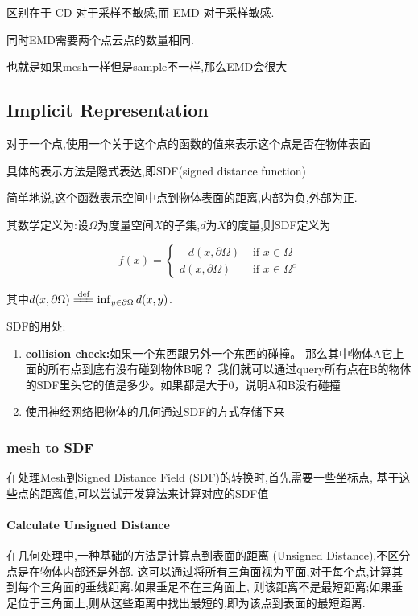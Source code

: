 区别在于 CD 对于采样不敏感,而 EMD 对于采样敏感.

同时EMD需要两个点云点的数量相同.

也就是如果mesh一样但是sample不一样,那么EMD会很大

\subsection{Implicit Representation}

对于一个点,使用一个关于这个点的函数的值来表示这个点是否在物体表面

具体的表示方法是隐式表达,即SDF(signed distance function)

简单地说,这个函数表示空间中点到物体表面的距离,内部为负,外部为正.

其数学定义为:设$\Omega$为度量空间$X$的子集,$d$为$X$的度量,则SDF定义为

\begin{equation}
    f(x)=\begin{cases}
        -d(x, \partial \Omega) & \text { if } x \in \Omega 
        \\
        d(x, \partial \Omega) & \text { if } x \in \Omega^{c}
    \end{cases}
\end{equation}

其中$d(x, \partial \Omega) \xlongequal{\text{def}} \inf_{y \in \partial \Omega} d(x, y)$.

SDF的用处:

\begin{enumerate}
    \item \textbf{collision check:}如果一个东西跟另外一个东西的碰撞。
    那么其中物体A它上面的所有点到底有没有碰到物体B呢？
    我们就可以通过query所有点在B的物体的SDF里头它的值是多少。如果都是大于0，说明A和B没有碰撞
    \item 使用神经网络把物体的几何通过SDF的方式存储下来
\end{enumerate}

\subsubsection{mesh to SDF}

在处理Mesh到Signed Distance Field (SDF)的转换时,首先需要一些坐标点,
基于这些点的距离值,可以尝试开发算法来计算对应的SDF值

\paragraph{Calculate Unsigned Distance}
在几何处理中,一种基础的方法是计算点到表面的距离 (Unsigned Distance),不区分点是在物体内部还是外部.
这可以通过将所有三角面视为平面,对于每个点,计算其到每个三角面的垂线距离.如果垂足不在三角面上,
则该距离不是最短距离;如果垂足位于三角面上,则从这些距离中找出最短的,即为该点到表面的最短距离.

